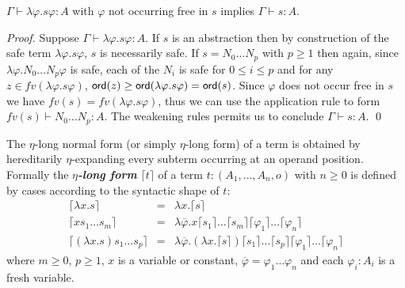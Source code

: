 \documentclass{llncs}
\newcommand\defname[1]{{\bf\em #1}\index{#1}}
\newcommand{\elnf}[1]{\lceil #1\rceil} %
\newcommand\ord[1]{{\sf
    ord}(#1)} \newcommand\typear{\rightarrow}
\begin{document}
\begin{lemma}
  $\Gamma \vdash \lambda \varphi . s \varphi :A $ with $\varphi$ not
  occurring free in $s$ implies $\Gamma \vdash s :A$.
\end{lemma}
\begin{proof}
  Suppose $\Gamma \vdash \lambda \varphi . s \varphi :A$. If $s$ is an  abstraction then by construction of the safe term $\lambda \varphi . s \varphi$, $s$ is necessarily safe.  If $s = N_0 \ldots N_p$ with
  $p\geq 1$ then again, since $\lambda \varphi . N_0 \ldots N_p
  \varphi$ is safe, each of the $N_i$ is safe for $0 \leq i \leq p$
  and for any $z\in fv(\lambda \varphi . s \varphi)$, $\ord{z} \geq
  \ord{\lambda \varphi . s \varphi} = \ord{s}$. Since  $\varphi$ does not occur free in $s$ we have $fv(s) = fv(\lambda \varphi . s \varphi)$, thus we can use the application rule to form $fv(s) \vdash N_0 \ldots N_p : A$. The weakening rules permits us to conclude $\Gamma \vdash s :A$. \qed
\end{proof}



The $\eta$-long normal form (or simply $\eta$-long form) of a term
is obtained by hereditarily $\eta$-expanding every subterm occurring
at an operand position. Formally the \defname{$\eta$-long form}
$\elnf{t}$ of a term $t: (A_1,\ldots,A_n,o)$ with $n \geq 0$ is
defined by cases according to the syntactic shape of $t$:
\begin{eqnarray*}
  \elnf{\lambda x . s } &=& \lambda x . \elnf{s} \\
  \elnf{x s_1 \ldots s_m } &=& \lambda \overline{\varphi} . x \elnf{s_1}\ldots \elnf{s_m} \elnf{\varphi_1} \ldots \elnf{\varphi_n} \\
  \elnf{(\lambda x . s) s_1 \ldots s_p } &=& \lambda \overline{\varphi} . (\lambda x . \elnf{s}) \elnf{s_1} \ldots \elnf{s_p} \elnf{\varphi_1} \ldots \elnf{\varphi_n}
\end{eqnarray*}
where $m \geq 0$, $p\geq 1$, $x$ is a  variable or constant, $\overline{\varphi} = \varphi_1 \ldots \varphi_n$ and each $\varphi_i : A_i$ is a fresh variable.

\end{document}
